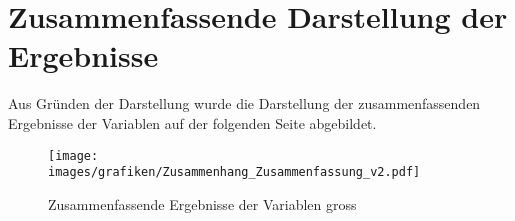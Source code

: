 \section{Zusammenfassende Darstellung der Ergebnisse}\label{anhang.zusammenfassendeDarstellung}

Aus Gründen der Darstellung wurde die Darstellung der zusammenfassenden Ergebnisse der Variablen auf der folgenden Seite abgebildet.
\begin{figure}
    \centering
    \texttt{[image: images/grafiken/Zusammenhang\_Zusammenfassung\_v2.pdf]}
     \caption{Zusammenfassende Ergebnisse der Variablen gross}
     \label{pic.ergebniss.zusammenfassungGross}
\end{figure}

